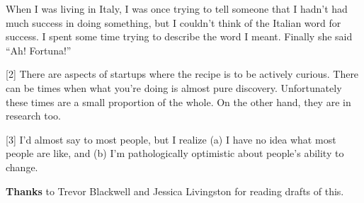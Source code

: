 When I was living in Italy, I was once trying to tell someone that I
hadn't had much success in doing something, but I couldn't think of the
Italian word for success. I spent some time trying to describe the word
I meant. Finally she said ``Ah! Fortuna!''

{[}2{]} There are aspects of startups where the recipe is to be actively
curious. There can be times when what you're doing is almost pure
discovery. Unfortunately these times are a small proportion of the
whole. On the other hand, they are in research too.

{[}3{]} I'd almost say to most people, but I realize (a) I have no idea
what most people are like, and (b) I'm pathologically optimistic about
people's ability to change.

\textbf{Thanks} to Trevor Blackwell and Jessica Livingston for reading
drafts of this.
